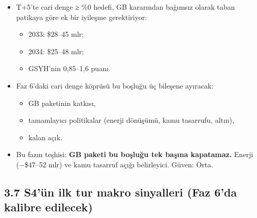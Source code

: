 \begin{itemize}
\tightlist
\item
  T+5'te cari denge ≥ \%0 hedefi, GB kararından bağımsız olarak taban patikaya göre ek bir iyileşme gerektiriyor:

  \begin{itemize}
  \tightlist
  \item
    2033: \$28--45 mlr;
  \item
    2034: \$25--48 mlr;
  \item
    GSYH'nin 0,85--1,6 puanı.
  \end{itemize}
\item
  Faz 6'daki cari denge köprüsü bu boşluğu üç bileşene ayıracak:

  \begin{itemize}
  \tightlist
  \item
    GB paketinin katkısı,
  \item
    tamamlayıcı politikalar (enerji dönüşümü, kamu tasarrufu, altın),
  \item
    kalan açık.
  \end{itemize}
\item
  Bu fazın teşhisi: \textbf{GB paketi bu boşluğu tek başına kapatamaz.} Enerji (−\$47--52 mlr) ve kamu tasarruf açığı belirleyici. Güven: Orta.
\end{itemize}

\hypertarget{01_teshis-37-s4uxfcn-ilk-tur-makro-sinyalleri-faz-6da-kalibre-edilecek}{%
\subsection{3.7 S4'ün ilk tur makro sinyalleri (Faz 6'da kalibre edilecek)}\label{01_teshis-37-s4uxfcn-ilk-tur-makro-sinyalleri-faz-6da-kalibre-edilecek}}

\begingroup\gbtablo\small

